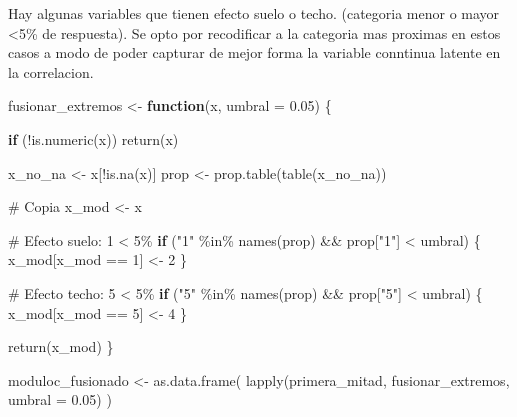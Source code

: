 \documentclass[
  letterpaper,
  DIV=11,
  numbers=noendperiod]{scrartcl}
\newenvironment{Shaded}{\begin{snugshade}}{\end{snugshade}}
\newcommand{\AttributeTok}[1]{\textcolor[rgb]{0.40,0.45,0.13}{#1}}
\newcommand{\CommentTok}[1]{\textcolor[rgb]{0.37,0.37,0.37}{#1}}
\newcommand{\ControlFlowTok}[1]{\textcolor[rgb]{0.00,0.23,0.31}{\textbf{#1}}}
\newcommand{\DecValTok}[1]{\textcolor[rgb]{0.68,0.00,0.00}{#1}}
\newcommand{\FloatTok}[1]{\textcolor[rgb]{0.68,0.00,0.00}{#1}}
\newcommand{\FunctionTok}[1]{\textcolor[rgb]{0.28,0.35,0.67}{#1}}
\newcommand{\NormalTok}[1]{\textcolor[rgb]{0.00,0.23,0.31}{#1}}
\newcommand{\OtherTok}[1]{\textcolor[rgb]{0.00,0.23,0.31}{#1}}
\newcommand{\SpecialCharTok}[1]{\textcolor[rgb]{0.37,0.37,0.37}{#1}}
\newcommand{\StringTok}[1]{\textcolor[rgb]{0.13,0.47,0.30}{#1}}
\begin{document}
Hay algunas variables que tienen efecto suelo o techo. (categoria menor
o mayor \textless5\% de respuesta). Se opto por recodificar a la
categoria mas proximas en estos casos a modo de poder capturar de mejor
forma la variable conntinua latente en la correlacion.

\begin{Shaded}
\begin{Highlighting}[]
\NormalTok{fusionar\_extremos }\OtherTok{\textless{}{-}} \ControlFlowTok{function}\NormalTok{(x, }\AttributeTok{umbral =} \FloatTok{0.05}\NormalTok{) \{}
  
  \ControlFlowTok{if}\NormalTok{ (}\SpecialCharTok{!}\FunctionTok{is.numeric}\NormalTok{(x)) }\FunctionTok{return}\NormalTok{(x)}
  
\NormalTok{  x\_no\_na }\OtherTok{\textless{}{-}}\NormalTok{ x[}\SpecialCharTok{!}\FunctionTok{is.na}\NormalTok{(x)]}
\NormalTok{  prop }\OtherTok{\textless{}{-}} \FunctionTok{prop.table}\NormalTok{(}\FunctionTok{table}\NormalTok{(x\_no\_na))}
  
  \CommentTok{\# Copia}
\NormalTok{  x\_mod }\OtherTok{\textless{}{-}}\NormalTok{ x}
  
  \CommentTok{\# Efecto suelo: 1 \textless{} 5\%}
  \ControlFlowTok{if}\NormalTok{ (}\StringTok{"1"} \SpecialCharTok{\%in\%} \FunctionTok{names}\NormalTok{(prop) }\SpecialCharTok{\&\&}\NormalTok{ prop[}\StringTok{"1"}\NormalTok{] }\SpecialCharTok{\textless{}}\NormalTok{ umbral) \{}
\NormalTok{    x\_mod[x\_mod }\SpecialCharTok{==} \DecValTok{1}\NormalTok{] }\OtherTok{\textless{}{-}} \DecValTok{2}
\NormalTok{  \}}
  
  \CommentTok{\# Efecto techo: 5 \textless{} 5\%}
  \ControlFlowTok{if}\NormalTok{ (}\StringTok{"5"} \SpecialCharTok{\%in\%} \FunctionTok{names}\NormalTok{(prop) }\SpecialCharTok{\&\&}\NormalTok{ prop[}\StringTok{"5"}\NormalTok{] }\SpecialCharTok{\textless{}}\NormalTok{ umbral) \{}
\NormalTok{    x\_mod[x\_mod }\SpecialCharTok{==} \DecValTok{5}\NormalTok{] }\OtherTok{\textless{}{-}} \DecValTok{4}
\NormalTok{  \}}
  
  \FunctionTok{return}\NormalTok{(x\_mod)}
\NormalTok{\}}


\NormalTok{moduloc\_fusionado }\OtherTok{\textless{}{-}} \FunctionTok{as.data.frame}\NormalTok{(}
  \FunctionTok{lapply}\NormalTok{(primera\_mitad, fusionar\_extremos, }\AttributeTok{umbral =} \FloatTok{0.05}\NormalTok{)}
\NormalTok{)}
\end{Highlighting}
\end{Shaded}
\end{document}
